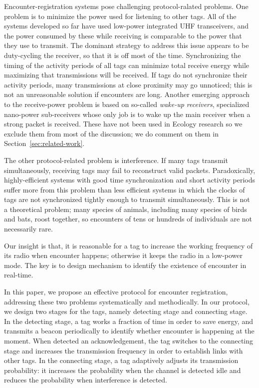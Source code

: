 Encounter-registration systems pose challenging protocol-ralated problems. One problem is to minimize
the power used for listening to other tags. All of the systems developed so far have used low-power integrated
UHF transceivers, and the power consumed by these while receiving is comparable to the power that they use
to transmit. The dominant strategy to address this issue appears to be duty-cycling the receiver, so that it is
off most of the time. Synchronizing the timing of the activity periods of all tags can minimize total receive energy
while maximizing that transmissions will be received. If tags do not synchronize their activity periods, many transmissions
at close proximity may go unnoticed; this is not an unreasonable solution if encounters are long. Another emerging approach
to the receive-power problem is based on so-called {\em wake-up receivers}, specialized nano-power sub-receivers whose only
job is to wake up the main receiver when a strong packet is received. These have not been used in Ecology research so we
exclude them from most of the discussion; we do comment on them in Section~\ref{sec:related-work}.

The other protocol-related problem is interference. If many tags transmit simultaneously, receiving tags may fail
to reconstruct valid packets. Paradoxically, highly-efficient systems with good time synchronization and short activity
periods suffer more from this problem than less efficient systems in which the clocks of tags are not synchronized tightly
enough to transmit simultaneously. This is not a theoretical problem; many species of animals, including many species of
birds and bats, roost together, so encounters of tens or hundreds of individuals are not necessarily rare.

Our insight is that, it is reasonable for a tag to
increase the working frequency of its radio when encounter happens; otherwise it keeps
the radio in a low-power mode. The key is to design mechanism
to identify the existence of encounter in real-time. 


In this paper, we propose an effective protocol for encounter registration, 
addressing these two problems systematically and
methodically. In our protocol, 
we design two stages for the tags, namely detecting stage and connecting stage.
In the detecting stage, a tag works a fraction of time in order to save energy,
and transmits a beacon periodically to identify whether encounter is happening at the moment.
When detected an acknowledgement, the tag switches to the connecting stage and increases the 
transmission frequency in order to establish links with other tags. In the connecting stage,
a tag adaptively adjusts its transmission probability: it increases the probability when 
the channel is detected idle and reduces the probability when interference is detected.  


